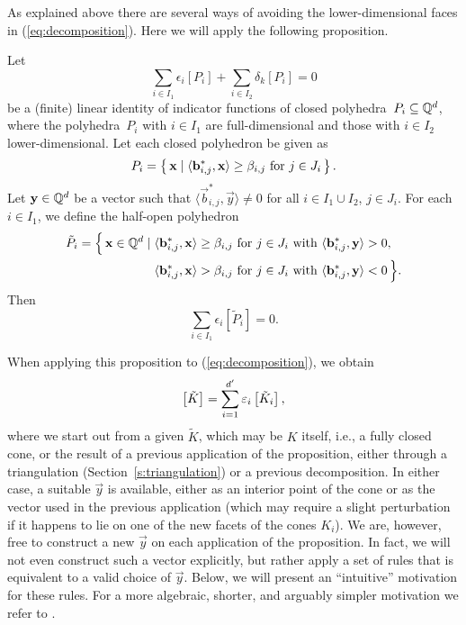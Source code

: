 As explained above there are several ways of avoiding the lower-dimensional
faces in (\ref{eq:decomposition}).  Here we will apply the following proposition.
\begin{proposition}
\label{p:inclusion-exclusion}
  Let 
  \begin{equation}
    \label{eq:full-source-identity}
    \sum_{i\in {I_1}} \epsilon_i [P_i] + \sum_{i\in {I_2}} \delta_k [P_i] = 0
  \end{equation}
  be a (finite) linear identity of indicator functions of closed
  polyhedra~$P_i\subseteq\mathbb{Q}^d$, where the
  polyhedra~$P_i$ with $i \in I_1$ are full-dimensional and those with $i \in I_2$
  lower-dimensional.  Let each closed polyhedron be given as 
$$
    P_i = \left\{\, \vec x \mid \sp{b^*_{i,j}}{x} \ge \beta_{i,j} \text{
      for $j\in J_i$}\,\right\}
  .
$$
  Let $\vec y\in\QQ^d$ be a vector such that $\langle \vec b^*_{i,j}, \vec
  y\rangle \neq 0$ for all $i\in I_1\cup I_2$, $j\in J_i$.
  For each $i\in I_1$, we define the half-open polyhedron
  \begin{equation}
    \label{eq:half-open-by-y}
    \begin{aligned}
      \tilde P_i = \Bigl\{\, \vec x\in\QQ^d \mid {}&
	    \sp{b^*_{i,j}}{x} \ge \beta_{i,j}
      \text{ for $j\in J_i$ with $\sp{b^*_{i,j}}{y} > 0$,} \\
      & \sp{b^*_{i,j}}{x} > \beta_{i,j}
      \text{ for $j\in J_i$ with $\sp{b^*_{i,j}}{y} < 0$} \,\Bigr\}.
    \end{aligned}
  \end{equation}
  Then 
  \begin{equation}
    \label{eq:target-identity}
    \sum_{i\in I_1} \epsilon_i [\tilde P_i] = 0.
  \end{equation}
\end{proposition}
When applying this proposition to (\ref{eq:decomposition}), we obtain
\begin{equation}
\label{eq:decomposition:2}
\indf{\tilde K} = \sum_{i=1}^{d'} \varepsilon_i \indf{\tilde K_i}
,
\end{equation}
where we start out
from a given $\tilde K$, which may be $K$ itself, i.e., a fully closed cone,
or the result of a previous application of the proposition, either through
a triangulation (Section~\ref{s:triangulation}) or a previous decomposition.
In either case, a suitable $\vec y$ is available, either as an interior
point of the cone or as the vector used in the previous application
(which may require a slight perturbation if it happens to lie on one of
the new facets of the cones $K_i$).
We are, however, free to construct a new $\vec y$ on each application
of the proposition.
In fact, we will not even construct such a vector explicitly, but
rather apply a set of rules that is equivalent to a valid choice of $\vec y$.
Below, we will present an ``intuitive'' motivation for these rules.
For a more algebraic, shorter, and arguably simpler motivation we
refer to .

